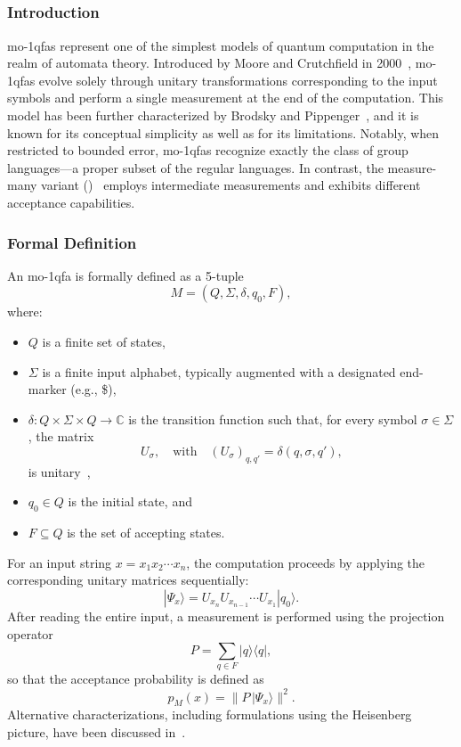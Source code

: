 \subsection{}
\label{sec:moqfa}

\subsubsection{Introduction}
\glspl{mo-1qfa} represent one of the simplest models of quantum computation in the realm of automata theory. Introduced by Moore and Crutchfield in 2000~\cite{moore2000quantum}, \gls{mo-1qfa}s evolve solely through unitary transformations corresponding to the input symbols and perform a single measurement at the end of the computation. This model has been further characterized by Brodsky and Pippenger~\cite{brodsky2002characterizations}, and it is known for its conceptual simplicity as well as for its limitations. Notably, when restricted to bounded error, \gls{mo-1qfa}s recognize exactly the class of group languages—a proper subset of the regular languages. In contrast, the measure-many variant ()~\cite{646094} employs intermediate measurements and exhibits different acceptance capabilities.

\subsubsection{Formal Definition}
An \gls{mo-1qfa} is formally defined as a 5-tuple 
\[
M = (Q,\Sigma,\delta,q_0,F),
\]
where:
\begin{itemize}
    \item $Q$ is a finite set of states,
    \item $\Sigma$ is a finite input alphabet, typically augmented with a designated end-marker (e.g., \$),
    \item $\delta : Q \times \Sigma \times Q \to \mathbb{C}$ is the transition function such that, for every symbol $\sigma\in\Sigma$, the matrix 
    \[
    U_\sigma,\quad \text{with} \quad (U_\sigma)_{q,q'} = \delta(q,\sigma,q'),
    \]
    is unitary~\cite{moore2000quantum},
    \item $q_0 \in Q$ is the initial state, and
    \item $F\subseteq Q$ is the set of accepting states.
\end{itemize}
For an input string $x=x_1x_2\cdots x_n$, the computation proceeds by applying the corresponding unitary matrices sequentially:
\[
|\Psi_x\rangle = U_{x_n}U_{x_{n-1}}\cdots U_{x_1}|q_0\rangle.
\]
After reading the entire input, a measurement is performed using the projection operator
\[
P=\sum_{q\in F} |q\rangle\langle q|,
\]
so that the acceptance probability is defined as
\[
p_M(x)=\|P\,|\Psi_x\rangle\|^2.
\]
Alternative characterizations, including formulations using the Heisenberg picture, have been discussed in~\cite{QIU2004479,10.1007/978-3-031-16336-4_18}.

